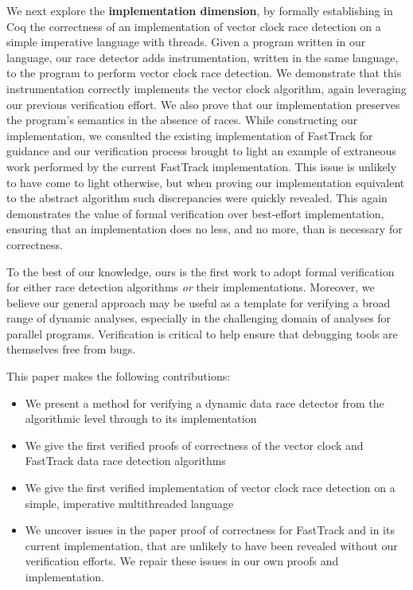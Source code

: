 \documentclass[preprint, 10pt]{sigplanconf}
\begin{document}
We next explore the \textbf{implementation dimension}, by formally establishing in Coq the correctness of an implementation of vector clock race detection on a simple imperative language with threads. Given a program written in our language, our race detector adds instrumentation, written in the same language, to the program to perform vector clock race detection. We demonstrate that this instrumentation correctly implements the vector clock algorithm, again leveraging our previous verification effort. We also prove that our implementation preserves the program's semantics in the absence of races. While constructing our implementation, we consulted the existing implementation of FastTrack for guidance and our verification process brought to light an example of extraneous work performed by the current FastTrack implementation. This issue is unlikely to have come to light otherwise, but when proving our implementation equivalent to the abstract algorithm such discrepancies were quickly revealed. This again demonstrates the value of formal verification over best-effort implementation, ensuring that an implementation does no less, and no more, than is necessary for correctness.

To the best of our knowledge, ours is the first work to adopt formal verification for either race detection algorithms \emph{or} their implementations. Moreover, we believe our general approach may be useful as a template for verifying a broad range of dynamic analyses, especially in the challenging domain of analyses for parallel programs. Verification is critical to help ensure that debugging tools are themselves free from bugs.

This paper makes the following contributions:

\begin{itemize}
\item We present a method for verifying a dynamic data race detector from the algorithmic level through to its implementation
\item We give the first verified proofs of correctness of the vector clock and FastTrack data race detection algorithms
\item We give the first verified implementation of vector clock race detection on a simple, imperative multithreaded language
\item We uncover issues in the paper proof of correctness for FastTrack and in its current implementation, that are unlikely to have been revealed without our verification efforts. We repair these issues in our own proofs and implementation.
\end{itemize}
\end{document}
